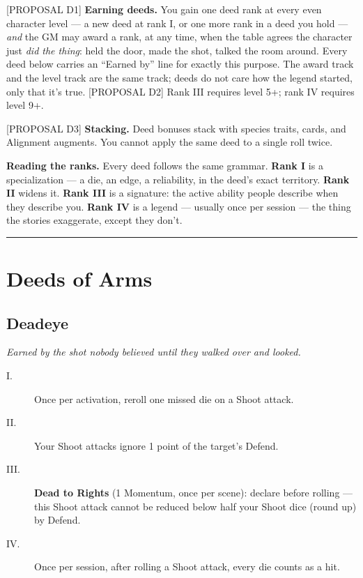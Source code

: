 [PROPOSAL D1] \textbf{Earning deeds.} You gain one deed rank at every even character level --- a new deed at rank I, or one more rank in a deed you hold --- \textit{and} the GM may award a rank, at any time, when the table agrees the character just \textit{did the thing}: held the door, made the shot, talked the room around. Every deed below carries an ``Earned by'' line for exactly this purpose. The award track and the level track are the same track; deeds do not care how the legend started, only that it's true. [PROPOSAL D2] Rank III requires level 5+; rank IV requires level 9+.

[PROPOSAL D3] \textbf{Stacking.} Deed bonuses stack with species traits, cards, and Alignment augments. You cannot apply the same deed to a single roll twice.

\textbf{Reading the ranks.} Every deed follows the same grammar. \textbf{Rank I} is a specialization --- a die, an edge, a reliability, in the deed's exact territory. \textbf{Rank II} widens it. \textbf{Rank III} is a signature: the active ability people describe when they describe you. \textbf{Rank IV} is a legend --- usually once per session --- the thing the stories exaggerate, except they don't.

\medskip\hrule\medskip

\section{Deeds of Arms}

\subsection{Deadeye}
\textit{Earned by the shot nobody believed until they walked over and looked.}
\begin{description}
    \item[I.] Once per activation, reroll one missed die on a Shoot attack.
    \item[II.] Your Shoot attacks ignore 1 point of the target's Defend.
    \item[III.] \textbf{Dead to Rights} (1 Momentum, once per scene): declare before rolling --- this Shoot attack cannot be reduced below half your Shoot dice (round up) by Defend.
    \item[IV.] Once per session, after rolling a Shoot attack, every die counts as a hit.
\end{description}

